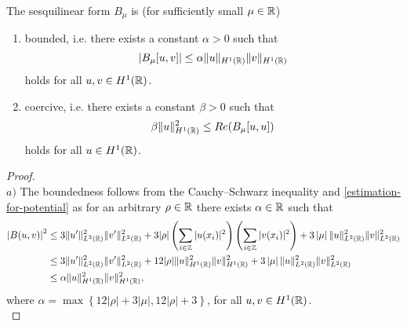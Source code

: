 \begin{theorem} \label{2.1:thm-LaxMilgram}
	The sesquilinear form $B_{\mu}$ is (for sufficiently small $\mu \in \mathbb{R}$)
	\begin{enumerate}[label=\alph*\upshape)]
		\item bounded, i.e. there exists a constant $\alpha > 0$ such that
			\[ \left| B_{\mu}[u,v] \right| \leq \alpha \|u\|_{H^{1}(\mathbb{R})} \|v\|_{H^{1}(\mathbb{R})} \]
			holds for all $u, v \in H^{1}(\mathbb{R})$.
		\item coercive, i.e. there exists a constant $\beta > 0$ such that
			\[ \beta \|u\|_{H^{1}(\mathbb{R})}^{2} \leq Re(B_{\mu}[u, u]) \]
			holds for all $u \in H^{1}(\mathbb{R})$.
	\end{enumerate} 
	
	\begin{proof} ~\\
		$a)$ The boundedness follows from the Cauchy–Schwarz inequality and \eqref{estimation-for-potential} as for an arbitrary $\rho \in \mathbb{R}$ there exists $\alpha \in \mathbb{R}$ such that 
		\begin{align*}
			\left| B(u, v) \right|^{2} & \leq 3 \| u' \|_{L^{2}(\mathbb{R})}^{2} \| v' \|_{L^{2}(\mathbb{R})}^{2} + 3 |\rho |\left( \sum_{i \in \mathbb{Z}} |u(x_{i})|^{2} \right)\left( \sum_{i \in \mathbb{Z}} |v(x_{i})|^{2} \right) + 3 \left| \mu \right| \| u \|_{L^{2}(\mathbb{R})}^{2} \| v \|_{L^{2}(\mathbb{R})}^{2} \\
				& \leq 3 \| u' \|_{L^{2}(\mathbb{R})}^{2} \| v' \|_{L^{2}(\mathbb{R})}^{2} + 12 |\rho| \| u \|^{2}_{H^{1}(\mathbb{R})} \| v \|^{2}_{H^{1}(\mathbb{R})}  + 3 \left| \mu \right| \| u \|_{L^{2}(\mathbb{R})}^{2} \| v \|_{L^{2}(\mathbb{R})}^{2} \\
				& \leq \alpha \| u \|^{2}_{H^{1}(\mathbb{R})} \| v \|^{2}_{H^{1}(\mathbb{R})},
		\end{align*}
		where $\alpha = \max \left\{ 12|\rho| + 3\left| \mu \right| , 12 |\rho| + 3 \right\}$, for all $u, v \in H^{1}(\mathbb{R})$. \\
		

\end{proof}
\end{theorem}
